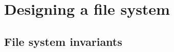 \documentclass[sigconf,anonymous,10pt]{acmart}
\begin{document}











\section{Designing a file system}

\subsection{File system invariants}
\end{document}
